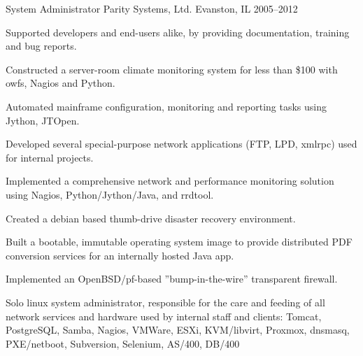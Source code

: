 \begin{cventries}
{\vspace*{3ex} %
}
  \cventry
    {System Administrator} %
    {Parity Systems, Ltd.} %
    {Evanston, IL} %
    {2005--2012} %
    {
      \begin{cvitems} %
        \item {Supported developers and end-users alike, by providing documentation, training and bug reports.}
        \item {Constructed a server-room climate monitoring system for less than \$100 with owfs, Nagios and Python.}
        \item {Automated mainframe configuration, monitoring and reporting tasks using Jython, JTOpen.}
        \item {Developed several special-purpose network applications (FTP, LPD, xmlrpc) used for internal projects.}
        \item {Implemented a comprehensive network and performance monitoring solution using Nagios, Python/Jython/Java, and rrdtool.}
        \item {Created a debian based thumb-drive disaster recovery environment.}
        \item {Built a bootable, immutable operating system image to provide distributed PDF conversion services for an internally hosted Java app.}
        \item {Implemented an OpenBSD/pf-based ”bump-in-the-wire” transparent firewall.}
      \end{cvitems}
    }
    {
      \begin{cventrysummary}
        Solo linux system administrator, responsible for the care and feeding of all network services and hardware used by internal staff and clients:
        Tomcat, PostgreSQL, Samba, Nagios, VMWare, ESXi, KVM/libvirt, Proxmox, dnsmasq, PXE/netboot, Subversion, Selenium, AS/400, DB/400
      \end{cventrysummary}
    }


\end{cventries}
